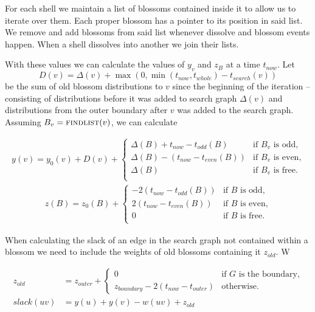 For each shell we maintain a list of blossoms contained inside it to allow us to iterate over them. Each proper blossom has a pointer to its position in said list. We remove and add blossoms from said list whenever dissolve and blossom events happen. When a shell dissolves into another we join their lists.

With these values we can calculate the values of $y_v$ and $z_B$ at a time $t_{now}$. Let 
\[ D(v) = \Delta(v) + \max(0, \min(t_{now}, t_{whole}) - t_{search}(v)) \] 
be the sum of old blossom distributions to $v$ since the beginning of the iteration – consisting of distributions before it was added to search graph $\Delta(v)$ and distributions from the outer boundary after $v$ was added to the search graph. Assuming $B_v = \textsc{findlist}(v)$, we can calculate

\begin{align*}
    y(v) = y_0(v) + D(v) + 
    \begin{cases}
        \Delta(B) + t_{now} - t_{odd}(B) & \text{if $B_v$ is odd,} \\
        \Delta(B) - (t_{now} - t_{even}(B)) & \text{if $B_v$ is even,} \\
        \Delta(B) & \text{if $B_v$ is free.} \\
    \end{cases}
\end{align*}
\begin{align*}
    z(B) = z_0(B) + 
    \begin{cases}
        -2(t_{now} - t_{odd}(B)) & \text{if $B$ is odd,} \\
        2(t_{now} - t_{even}(B)) & \text{if $B$ is even,} \\
        0 & \text{if $B$ is free.} \\
    \end{cases}
\end{align*}

When calculating the slack of an edge in the search graph not contained within a blossom we need to include the weights of old blossoms containing it $z_{old}$. W

\begin{align*}
    z_{old} &= z_{outer} + \begin{cases}
        0 & \text{if $G$ is the boundary,} \\
        z_{boundary} - 2(t_{now} - t_{outer}) & \text{otherwise.}
    \end{cases} \\
    slack(uv) &= y(u) + y(v) - w(uv) + z_{old}
\end{align*}

